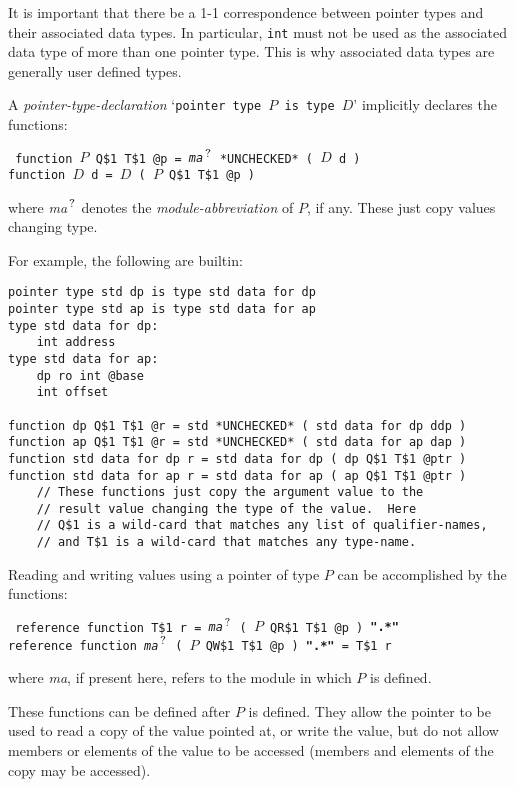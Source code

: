 \documentclass[12pt]{article}
\newcommand{\QMARK}{{$^{\,\mbox{\footnotesize ?}}$}}
\newcommand{\ttkey}[1]{{\tt \bfseries #1}}
\newenvironment{indpar}[1][0.3in]%
	{\begin{list}{}%
		     {\setlength{\itemsep}{0in}%
		      \setlength{\topsep}{0in}%
		      \setlength{\parsep}{1ex}%
		      \setlength{\labelwidth}{#1}%
		      \setlength{\leftmargin}{#1}%
		      \addtolength{\leftmargin}{\labelsep}}%
	 \item}%
	{\end{list}}
\begin{document}
It is important that there be a 1-1 correspondence between
pointer types and their associated data types.  In particular,
{\tt int} must not be used as the associated data type of
more than one pointer type.  This is why associated data types
are generally user defined types.

A {\em pointer-type-declaration} `{\tt pointer type $P$ is type $D$}'
implicitly declares the functions:
\begin{indpar} \tt
function $P$ Q\$1 T\$1 @p = {\em ma}\QMARK{} *UNCHECKED* ( $D$ d ) \\
function $D$ d = $D$ ( $P$ Q\$1 T\$1 @p )
\end{indpar}
where {\em ma}\QMARK{} denotes the {\em module-abbreviation} of $P$,
if any.
These just copy values changing type.

For example, the following are builtin:

\begin{indpar}\begin{verbatim}
pointer type std dp is type std data for dp
pointer type std ap is type std data for ap
type std data for dp:
    int address
type std data for ap:
    dp ro int @base
    int offset

function dp Q$1 T$1 @r = std *UNCHECKED* ( std data for dp ddp )
function ap Q$1 T$1 @r = std *UNCHECKED* ( std data for ap dap )
function std data for dp r = std data for dp ( dp Q$1 T$1 @ptr )
function std data for ap r = std data for ap ( ap Q$1 T$1 @ptr )
    // These functions just copy the argument value to the
    // result value changing the type of the value.  Here
    // Q$1 is a wild-card that matches any list of qualifier-names,
    // and T$1 is a wild-card that matches any type-name.
\end{verbatim}\end{indpar}

Reading and writing values using a pointer of type $P$
can be accomplished by the functions:

\begin{indpar}[1ex] \tt
reference function T\$1 r =
    {\em ma}\QMARK{} ( $P$ QR\$1 T\$1 @p ) \ttkey{".*"} \\
reference function {\em ma}\QMARK{} ( $P$ QW\$1 T\$1 @p ) \ttkey{".*"} =
    T\$1 r
\end{indpar}
where {\em ma}, if present here, refers to the module in which $P$ is defined.

These functions can be defined after $P$ is defined.
They allow the pointer to be used to read a copy of the
value pointed at, or write the value, but do not allow
members or elements of the value to be accessed
(members and elements of the copy may be accessed).
\end{document}

